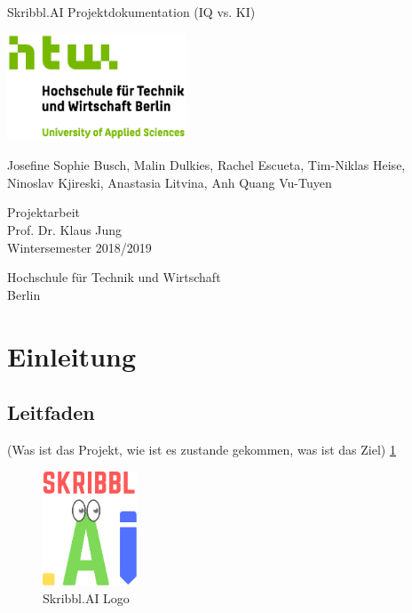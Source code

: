\documentclass[11pt]{article}
\begin{document}
\begin{titlepage}
   \begin{center}
       \vspace*{1cm}

       \Huge
       Skribbl.AI Projektdokumentation (IQ vs. KI)
       \vspace{2.0cm}

       \includegraphics[width=0.4\textwidth]{images/htw_logo.jpg}

       \vspace{1.5cm}
       \LARGE

       Josefine Sophie Busch, Malin Dulkies, Rachel Escueta, Tim-Niklas Heise, Ninoslav Kjireski, Anastasia Litvina, Anh Quang Vu-Tuyen

       \vfill

       Projektarbeit \\
       Prof. Dr. Klaus Jung\\
       Wintersemester 2018/2019\\

       \vspace{0.8cm}

       Hochschule für Technik und Wirtschaft\\
       Berlin\\

   \end{center}
\end{titlepage}

\pagebreak
\tableofcontents
\pagebreak
\listoftables
\listoffigures
\pagebreak

\section{Einleitung}
\subsection{Leitfaden}
 (Was ist das Projekt, wie ist es zustande gekommen, was ist das Ziel)
 \ref{fig:skribblLogo}
\begin{figure}[h]
	\includegraphics[width=0.25\textwidth]{images/skribbl_logo.png}
	\caption[Skribbl.AI Logo]{Skribbl.AI Logo}
	\label{fig:skribblLogo}
\end{figure}
\end{document}
